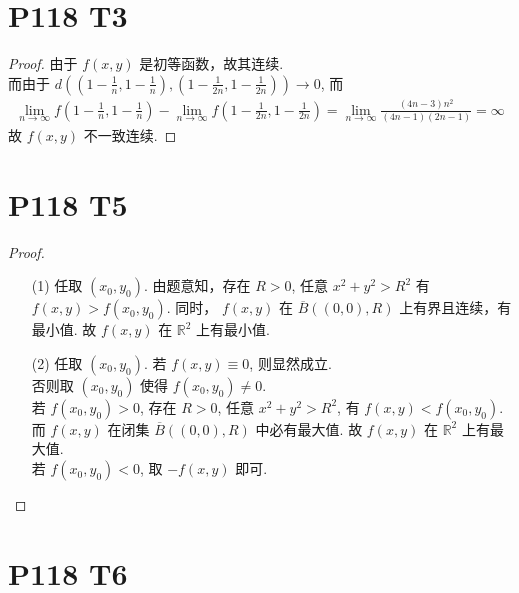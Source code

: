 \documentclass{article}
\begin{document}
\section*{P118 T3}

\begin{proof}
    由于 $f(x, y)$ 是初等函数，故其连续. \\
    而由于 $d\left(\left(1 - \frac{1}{n}, 1 - \frac{1}{n}\right), \left(1 - \frac{1}{2n}, 1 - \frac{1}{2n}\right)\right) \to 0$, 而 
    \begin{align*}
        \lim_{n \to \infty}f\left(1 - \frac{1}{n}, 1 - \frac{1}{n}\right) - \lim_{n \to \infty}f\left(1 - \frac{1}{2n}, 1 - \frac{1}{2n}\right) = \lim_{n \to \infty} \frac{(4n - 3)n^2}{(4n - 1)(2n - 1)} = \infty
    \end{align*}
    故 $f(x, y)$ 不一致连续.
\end{proof}

\section*{P118 T5}

\begin{proof}
    \begin{itemize}
        \item [(1)] 任取 $(x_0, y_0)$. 由题意知，存在 $R > 0$, 任意 $x^2 + y^2 > R^2$ 有 $f(x, y) > f(x_0, y_0)$. 同时， $f(x, y)$ 在 $\overline{B}((0, 0), R)$ 上有界且连续，有最小值. 故 $f(x, y)$ 在 $\mathbb{R}^2$ 上有最小值.
        \item [(2)] 任取 $(x_0, y_0)$. 若 $f(x, y) \equiv 0$, 则显然成立. \\
        否则取 $(x_0, y_0)$ 使得 $f(x_0, y_0) \neq 0$. \\
        若 $f(x_0, y_0) > 0$, 存在 $R > 0$, 任意 $x^2 + y^2 > R^2$, 有 $f(x, y) < f(x_0, y_0)$. 而 $f(x, y)$ 在闭集 $\overline{B}((0, 0), R)$ 中必有最大值. 故 $f(x, y)$ 在 $\mathbb{R}^2$ 上有最大值. \\
        若 $f(x_0, y_0) < 0$, 取 $-f(x, y)$ 即可.
    \end{itemize}
\end{proof}

\section*{P118 T6}
\end{document}
